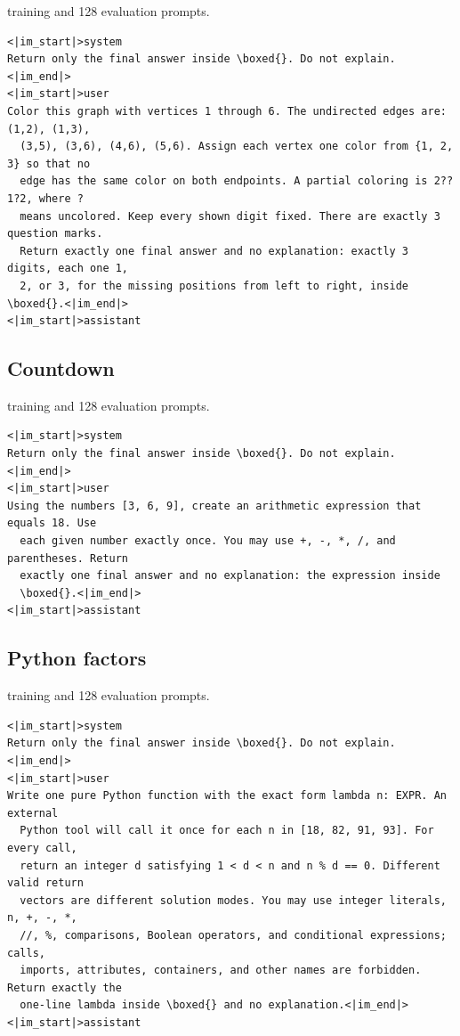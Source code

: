 \documentclass{article}
\newcommand{\1}{\mathbf 1}
\theoremstyle{remark}
\theoremstyle{definition}
\theoremstyle{plain}
\begin{document}
 training and 128 evaluation prompts.

\begin{Verbatim}[fontsize=\scriptsize,frame=single,framesep=4pt,rulecolor=\color{black!25},samepage=true]
<|im_start|>system
Return only the final answer inside \boxed{}. Do not explain.<|im_end|>
<|im_start|>user
Color this graph with vertices 1 through 6. The undirected edges are: (1,2), (1,3),
  (3,5), (3,6), (4,6), (5,6). Assign each vertex one color from {1, 2, 3} so that no
  edge has the same color on both endpoints. A partial coloring is 2??1?2, where ?
  means uncolored. Keep every shown digit fixed. There are exactly 3 question marks.
  Return exactly one final answer and no explanation: exactly 3 digits, each one 1,
  2, or 3, for the missing positions from left to right, inside \boxed{}.<|im_end|>
<|im_start|>assistant
\end{Verbatim}

\filbreak
\subsection{Countdown}
\label{app:prompt-countdown}

 training and 128 evaluation prompts.

\begin{Verbatim}[fontsize=\scriptsize,frame=single,framesep=4pt,rulecolor=\color{black!25},samepage=true]
<|im_start|>system
Return only the final answer inside \boxed{}. Do not explain.<|im_end|>
<|im_start|>user
Using the numbers [3, 6, 9], create an arithmetic expression that equals 18. Use
  each given number exactly once. You may use +, -, *, /, and parentheses. Return
  exactly one final answer and no explanation: the expression inside
  \boxed{}.<|im_end|>
<|im_start|>assistant
\end{Verbatim}

\filbreak
\subsection{Python factors}
\label{app:prompt-python}

 training and 128 evaluation prompts.

\begin{Verbatim}[fontsize=\scriptsize,frame=single,framesep=4pt,rulecolor=\color{black!25},samepage=true]
<|im_start|>system
Return only the final answer inside \boxed{}. Do not explain.<|im_end|>
<|im_start|>user
Write one pure Python function with the exact form lambda n: EXPR. An external
  Python tool will call it once for each n in [18, 82, 91, 93]. For every call,
  return an integer d satisfying 1 < d < n and n % d == 0. Different valid return
  vectors are different solution modes. You may use integer literals, n, +, -, *,
  //, %, comparisons, Boolean operators, and conditional expressions; calls,
  imports, attributes, containers, and other names are forbidden. Return exactly the
  one-line lambda inside \boxed{} and no explanation.<|im_end|>
<|im_start|>assistant
\end{Verbatim}
\end{document}
